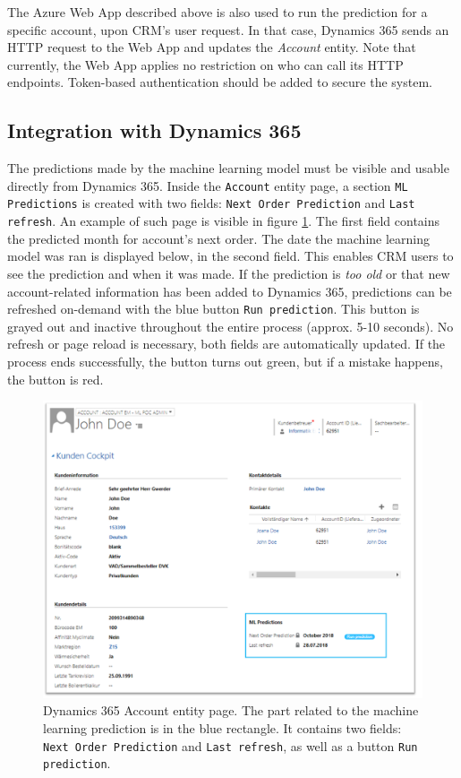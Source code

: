 The Azure Web App described above is also used to run the prediction for a specific account, upon CRM's user request. In that case, Dynamics 365 sends an HTTP request to the Web App and updates the \textit{Account} entity. Note that currently, the Web App applies no restriction on who can call its HTTP endpoints. Token-based authentication should be added to secure the system.

\subsection{Integration with Dynamics 365}
The predictions made by the machine learning model must be visible and usable directly from Dynamics 365. Inside the \texttt{Account} entity page, a section \texttt{ML Predictions} is created with two fields: \texttt{Next Order Prediction} and \texttt{Last refresh}. An example of such page is visible in figure \ref{fig:dynamics-account-ml-screenshot}. The first field contains the predicted month for account's next order. The date the machine learning model was ran is displayed below, in the second field. This enables CRM users to see the prediction and when it was made. If the prediction is \textit{too old} or that new account-related information has been added to Dynamics 365, predictions can be refreshed on-demand with the blue button \texttt{Run prediction}. This button is grayed out and inactive throughout the entire process (approx. 5-10 seconds). No refresh or page reload is necessary, both fields are automatically updated. If the process ends successfully, the button turns out green, but if a mistake happens, the button is red.

\begin{figure}[!htb]
    \centering
    \includegraphics[width=12cm]{images/dynamics-account-ml-screenshot.png}
    \caption[Dynamics 365 \textit{Account} entity page with predictions section]{Dynamics 365 Account entity page. The part related to the machine learning prediction is in the blue rectangle. It contains two fields: \texttt{Next Order Prediction} and \texttt{Last refresh}, as well as a button \texttt{Run prediction}.}
    \label{fig:dynamics-account-ml-screenshot}
\end{figure}

